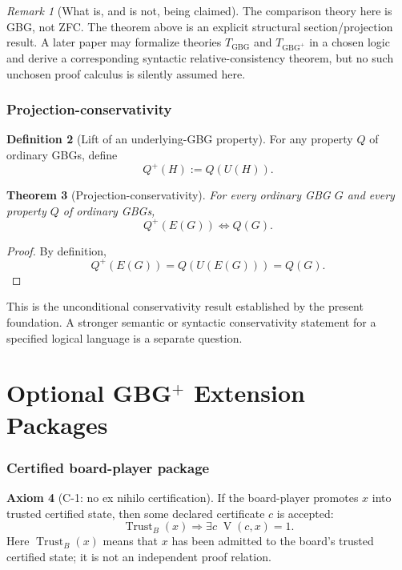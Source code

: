 \documentclass[11pt]{article}
\newtheorem{theorem}{Theorem}[section]
\theoremstyle{definition}
\newtheorem{definition}[theorem]{Definition}
\newtheorem{axiom}[theorem]{Axiom}
\theoremstyle{remark}
\newtheorem{remark}[theorem]{Remark}
\newcommand{\GBG}{\mathrm{GBG}}
\newcommand{\GBGp}{\mathrm{GBG}^{+}}
\newcommand{\V}{\operatorname{V}}
\begin{document}
\begin{remark}[What is, and is not, being claimed]
The comparison theory here is GBG, not ZFC.  The theorem above is an explicit structural section/projection result.  A later paper may formalize theories $T_{\GBG}$ and $T_{\GBGp}$ in a chosen logic and derive a corresponding syntactic relative-consistency theorem, but no such unchosen proof calculus is silently assumed here.
\end{remark}

\section{Projection-conservativity}

\begin{definition}[Lift of an underlying-GBG property]
For any property $Q$ of ordinary GBGs, define
\[
Q^{+}(H):=Q(U(H)).
\]
\end{definition}

\begin{theorem}[Projection-conservativity]
For every ordinary GBG $G$ and every property $Q$ of ordinary GBGs,
\[
\boxed{Q^{+}(E(G))\iff Q(G).}
\]
\end{theorem}

\begin{proof}
By definition,
\[
Q^{+}(E(G))=Q(U(E(G)))=Q(G).
\]
\end{proof}

This is the unconditional conservativity result established by the present foundation.  A stronger semantic or syntactic conservativity statement for a specified logical language is a separate question.

\part{Optional \texorpdfstring{GBG$^{+}$}{GBG+} Extension Packages}

\section{Certified board-player package}

\begin{axiom}[C-1: no ex nihilo certification]
If the board-player promotes $x$ into trusted certified state, then some declared certificate $c$ is accepted:
\[
\operatorname{Trust}_B(x)
\Longrightarrow
\exists c\;\V(c,x)=1.
\]
Here $\operatorname{Trust}_B(x)$ means that $x$ has been admitted to the board's trusted certified state; it is not an independent proof relation.
\end{axiom}
\end{document}
